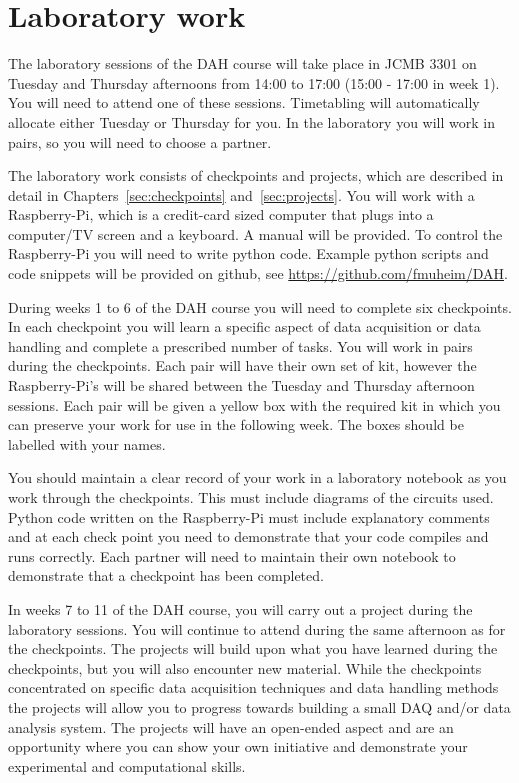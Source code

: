 \section{Laboratory work}

The laboratory sessions of the DAH course will take place in JCMB 3301 on Tuesday and Thursday afternoons from 14:00 to 17:00 (15:00 - 17:00 in week 1). You will need to attend one of these sessions. Timetabling will automatically allocate either Tuesday or Thursday for you. In the laboratory you will work in pairs, so you will need to choose a partner.

The laboratory work consists of checkpoints and projects, which are described in detail in Chapters~\ref{sec:checkpoints} and~\ref{sec:projects}.  You will work with a Raspberry-Pi, which is a credit-card sized computer that plugs into a computer/TV screen and a keyboard. A manual will be provided. To control the Raspberry-Pi you will need to write python code. Example python scripts and code snippets will be provided on github, see \url{https://github.com/fmuheim/DAH}. 

During weeks 1 to 6 of the DAH course you will need to complete six checkpoints. In each checkpoint you will learn a specific aspect of data acquisition or data handling and complete a prescribed number of tasks. You will work in pairs during the checkpoints.
Each pair will have their own set of kit, however the Raspberry-Pi's will be shared between the Tuesday and Thursday afternoon sessions. Each pair will be given a yellow box with the required kit in which you can preserve your work for use in the following week. The boxes should be labelled with your names.

You should maintain a clear record of your work in a laboratory notebook as you work through the checkpoints. This must include diagrams of the circuits used. Python code written on the Raspberry-Pi must include explanatory comments and at each check point you need to demonstrate that your code compiles and runs correctly.  Each partner will need to maintain their own notebook to demonstrate that a checkpoint has been completed. 



In weeks 7 to 11 of the DAH course, you will carry out a project during the laboratory sessions. You will continue to attend during the same afternoon as for the checkpoints.
The projects will build upon what you have learned during the checkpoints, but you will also encounter new material. While the checkpoints concentrated on specific data acquisition techniques and data handling methods the projects will allow you to progress towards building a small DAQ and/or data analysis system. The projects will have an open-ended aspect and are an opportunity where you can show your own initiative and demonstrate your experimental and computational skills. 

